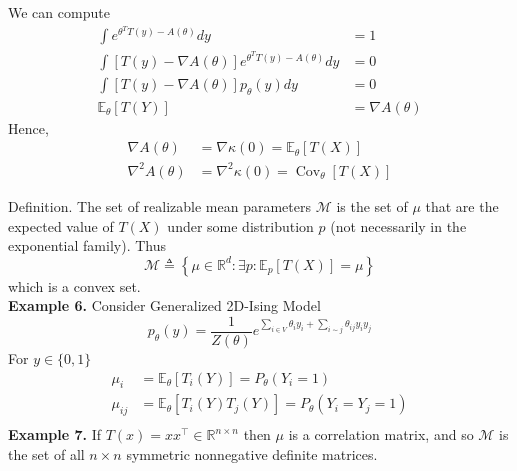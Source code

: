 \documentclass[11pt]{elegantbook}
\begin{document}
We can compute
\begin{equation}
    \begin{aligned}
        \int e^{\theta^T T(y)-A(\theta)} dy&=1\\
        \int [T(y)-\nabla A(\theta)] e^{\theta^T T(y)-A(\theta)} dy&=0\\
        \int[T(y)-\nabla A(\theta)]p_\theta(y) dy&=0\\
        \mathbb{E}_\theta [T(Y)]&=\nabla A(\theta)
    \end{aligned}
    \nonumber
\end{equation}
Hence,
\begin{equation}
    \begin{aligned}
    \nabla A(\theta) &=\nabla \kappa(0)=\mathbb{E}_\theta[T(X)] \\
    \nabla^2 A(\theta) &=\nabla^2 \kappa(0)=\operatorname{Cov}_\theta[T(X)]
    \end{aligned}
    \nonumber
\end{equation}

Definition. The set of realizable mean parameters $\mathcal{M}$ is the set of $\mu$ that are the expected value of $T(X)$ under some distribution $p$ (not necessarily in the exponential family). Thus
$$
\mathcal{M} \triangleq\left\{\mu \in \mathbb{R}^d: \exists p: \mathbb{E}_p[T(X)]=\mu\right\}
$$
which is a convex set.\\

\textbf{Example 6.} Consider Generalized 2D-Ising Model $$p_\theta(y)=\frac{1}{Z(\theta)}e^{\sum_{i\in V}\theta_i y_i +\sum _{i\sim j}\theta_{ij} y_iy_j}$$
For $y\in\{0,1\}$
\begin{equation}
    \begin{aligned}
        \mu_i&=\mathbb{E}_\theta \left[T_i(Y)\right]=P_\theta (Y_i=1)\\
        \mu_{ij}&=\mathbb{E}_\theta \left[T_i(Y)T_j(Y)\right]=P_\theta (Y_i=Y_j=1)\\
    \end{aligned}
    \nonumber
\end{equation}
\textbf{Example 7.} If $T(x)=x x^{\top} \in \mathbb{R}^{n \times n}$ then $\mu$ is a correlation matrix, and so $\mathcal{M}$ is the set of all $n \times n$ symmetric nonnegative definite matrices.
\end{document}
